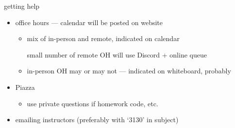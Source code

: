 \begin{frame}{getting help}
    \begin{itemize}
    \item office hours --- calendar will be posted on website
        \begin{itemize}
        \item mix of in-person and remote, indicated on calendar
        \item [small number of] remote OH will use Discord + online queue
        \item in-person OH may or may not --- indicated on whiteboard, probably
        \end{itemize}
    \item Piazza
        \begin{itemize}
        \item use private questions if homework code, etc.
        \end{itemize}
    \item emailing instructors (preferably with `3130' in subject)
    \end{itemize}
\end{frame}
